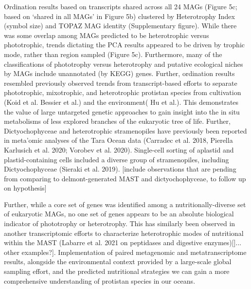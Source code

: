 \documentclass[12pt]{article}
\numberwithin{equation}{section}
\begin{document}
Ordination results based on transcripts shared across all 24 MAGs (Figure 5c; based on ‘shared in all MAGs’ in Figure 5b) clustered by Heterotrophy Index (symbol size) and TOPAZ MAG identity (Supplementary figure). While there was some overlap among MAGs predicted to be heterotrophic versus phototrophic, trends dictating the PCA results appeared to be driven by trophic mode, rather than region sampled (Figure 5c). Furthermore, many of the classifications of phototrophy versus heterotrophy and putative ecological niches by MAGs include unannotated (by KEGG) genes. Further, ordination results resembled previously observed trends from transcript-based efforts to separate phototrophic, mixotrophic, and heterotrophic protistan species from cultivation (Koid et al. Bessier et al.) and the environment( Hu et al.). This demonstrates the value of large untargeted genetic approaches to gain insight into the in situ metabolisms of less explored branches of the eukaryotic tree of life. Further, Dictyochophyceae and heterotrophic stramenopiles have previously been reported in meta’omic analyses of the Tara Ocean data (Carradec et al. 2018, Pierella Karlusich et al. 2020; Vorobev et al. 2020). Single-cell sorting of aplastid and plastid-containing cells included a diverse group of stramenopiles, including Dictyochophyceae (Sieraki et al. 2019). [include observations that are pending from comparing to delmont-generated MAST and dictyochophyceae, to follow up on hypothesis]

Further, while a core set of genes was identified among a nutritionally-diverse set of eukaryotic MAGs, no one set of genes appears to be an absolute biological indicator of phototrophy or heterotrophy. This has similarly been observed in another transcriptomic efforts to characterize heterotrophic modes of nutritional within the MAST (Labarre et al. 2021 on peptidases and digestive enzymes)[]... other examples?]. 
Implementation of paired metagenomic and metatranscriptome results, alongside the environmental context provided by a large-scale global sampling effort, and the predicted nutritional strategies we can gain a more comprehensive understanding of protistan species in our oceans.


\end{document}
